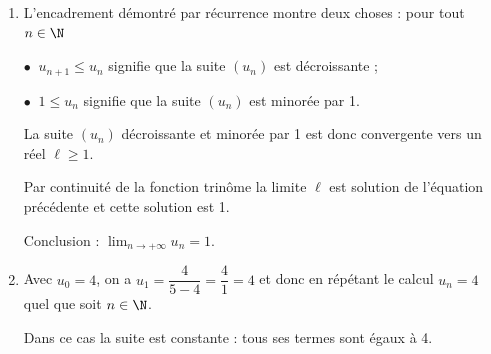 \begin{enumerate}
\begin{enumerate}
%
On a pour $x < 5$, \: $f(x) = x \iff \dfrac{4}{5 - x} = x \iff 4 = x(5 - x) \iff 4 = 5x - x^2 \iff x^2 - 5x + 4 = 0$.
		\item %
		Résoudre $f(x) = x$ dans l'intervalle $]-\infty~;~5[$, revient d'après la question précédente à résoudre l'équation du second degré $x^2 - 5x + 4 = 0$.
		
		Les racines de cette équation 1 et 4 sont évidentes (sinon on calcule le déterminant), donc :

$x^2 - 5x + 4 = 0 \iff (x - 1)( x - 4) = 0 \iff \left\{\begin{array}{l c l}
x - 1			&=&0\\
				&\text{ou}&\\
x - 4			&=&0
\end{array}\right. \iff \left\{\begin{array}{l c l}
x 	&=			&1\\
	&\text{ou}	&\\
x 	&=			& 4
\end{array}\right.$

la solution 4 n'est pas vraisemblable puisque $x < 4$, on a donc $S = \{1\}$.
	\end{enumerate}	
\item %

L'encadrement démontré par récurrence montre deux choses : pour tout $n \in \N$

$\bullet~$ $u_{n+1} \leqslant u_n$ signifie que la suite $\left(u_n\right)$ est décroissante ;

$\bullet~$ $1\leqslant u_n$ signifie que la suite $\left(u_n\right)$ est minorée par 1.

La suite $\left(u_n\right)$ décroissante et minorée par 1 est donc convergente vers un réel $\ell \geqslant 1$.

Par continuité de la fonction trinôme la limite $\ell$ est solution de l'équation précédente et cette solution est 1.

Conclusion : $\displaystyle\lim_{n \to + \infty} u_n = 1$.
\item %
Avec $u_0 = 4$, on a $u_1 = \dfrac{4}{5 - 4} =\dfrac41 = 4$ et donc en répétant le calcul $u_n = 4$ quel que soit $n \in \N$.

Dans ce cas la suite est constante : tous ses termes sont égaux à 4.
\end{enumerate}
